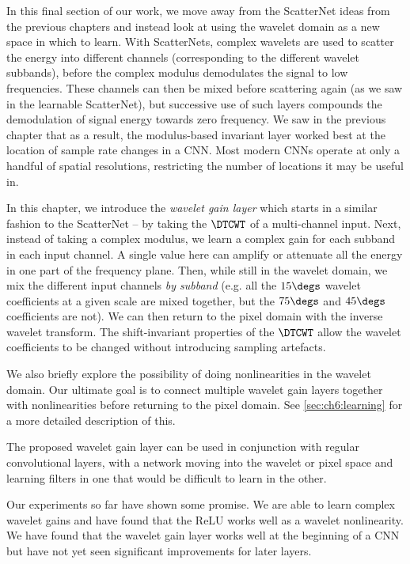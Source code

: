 In this final section of our work, we move away from the ScatterNet ideas from the previous
chapters and instead look at using the wavelet domain as a new space in which to
learn. With ScatterNets, complex wavelets are used to scatter the energy into
different channels (corresponding to the different wavelet subbands), before the
complex modulus demodulates the signal to low frequencies. These channels can
then be mixed before scattering again (as we saw in the learnable ScatterNet),
but successive use of such layers compounds the demodulation of signal energy
towards zero frequency. We saw in the previous chapter that as a result, the
modulus-based invariant layer worked best at the location of sample rate changes
in a CNN. Most modern CNNs
operate at only a handful of spatial resolutions, restricting the number of
locations it may be useful in.

In this chapter, we introduce the \emph{wavelet gain layer}
which starts in a similar fashion to the ScatterNet -- by taking the $\DTCWT$ of
a multi-channel input. Next, instead of taking a complex modulus, we learn a
complex gain for each subband in each input channel. A single value here can
amplify or attenuate all the energy in one part of the frequency plane. Then,
while still in the wavelet domain, we mix the different input channels \emph{by subband} (e.g.
all the $15\degs$ wavelet coefficients at a given scale are mixed together, but
the $75\degs$ and $45\degs$ coefficients are not). We can then return to the
pixel domain with the inverse wavelet transform. The shift-invariant properties
of the $\DTCWT$ allow the wavelet coefficients to be changed without
introducing sampling artefacts.

We also briefly explore the possibility of doing nonlinearities in the wavelet
domain. Our ultimate goal is to connect multiple wavelet gain layers
together with nonlinearities before returning to the pixel domain. See
\autoref{sec:ch6:learning} for a more detailed description of this.

The proposed wavelet gain layer can be used in conjunction with regular
convolutional layers, with a network moving into the wavelet or pixel space and
learning filters in one that would be difficult to learn in the other.

Our experiments so far have shown some promise. We are able to learn complex
wavelet gains and have found that the ReLU works well as a wavelet nonlinearity.
We have found that the wavelet gain layer works well at the beginning of a
CNN but have not yet seen significant improvements for later layers.

